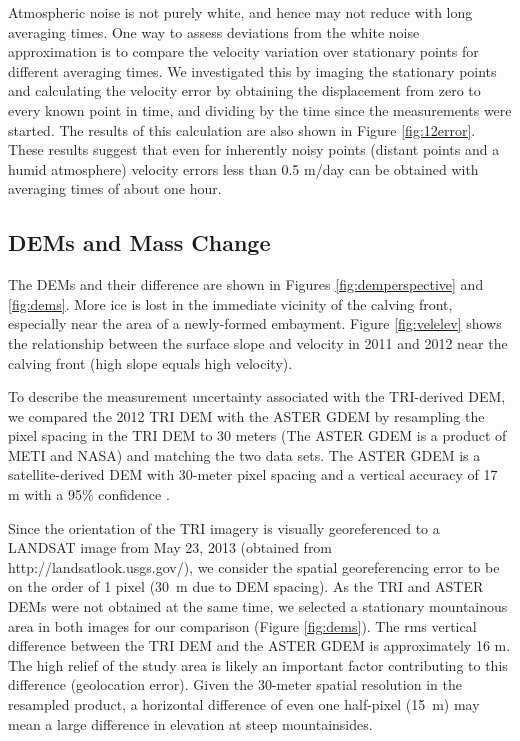 \documentclass[review]{igs}
\begin{document}
Atmospheric noise is not purely white, and hence may not reduce with long averaging times.  One way to assess deviations from the white noise approximation is to compare the velocity variation over stationary points for different averaging times. We investigated this by imaging the stationary points and calculating the velocity error by obtaining the displacement from zero to every known point in time, and dividing by the time since the measurements were started. The results of this calculation are also shown in Figure \ref{fig:12error}.  These results suggest that even for inherently noisy points (distant points and a humid atmosphere) velocity errors less than 0.5 m/day can be obtained with averaging times of about one hour.

\subsection{DEMs and Mass Change}
% 
The DEMs and their difference are shown in Figures \ref{fig:demperspective} and \ref{fig:dems}. More ice is lost in the immediate vicinity of the calving front, especially near the area of a newly-formed embayment.  Figure \ref{fig:velelev} shows the relationship between the surface slope and velocity in 2011 and 2012 near the calving front (high slope equals high velocity).




To describe the measurement uncertainty associated with the TRI-derived DEM, we compared the 2012 TRI DEM with the ASTER GDEM by resampling the pixel spacing in the TRI DEM to 30 meters (The ASTER GDEM is a product of METI and NASA) and matching the two data sets.  The ASTER GDEM is a satellite-derived DEM with 30-meter pixel spacing and a vertical accuracy of 17 m with a 95\% confidence \citep{aster2011validation}.  

Since the orientation of the TRI imagery is visually georeferenced to a LANDSAT image from May 23, 2013 (obtained from http://landsatlook.usgs.gov/), we consider the spatial georeferencing error to be on the order of 1 pixel (30~m due to DEM spacing). As the TRI and ASTER DEMs were not obtained at the same time, we selected a stationary mountainous area in both images for our comparison (Figure \ref{fig:dems}). The rms vertical difference between the TRI DEM and the ASTER GDEM is approximately 16 m. The high relief of the study area is likely an important factor contributing to this difference (geolocation error). Given the 30-meter spatial 
resolution in the 
resampled product, a horizontal difference of even one half-pixel (15~m) may 
mean a large difference in elevation at steep mountainsides.
\end{document}
